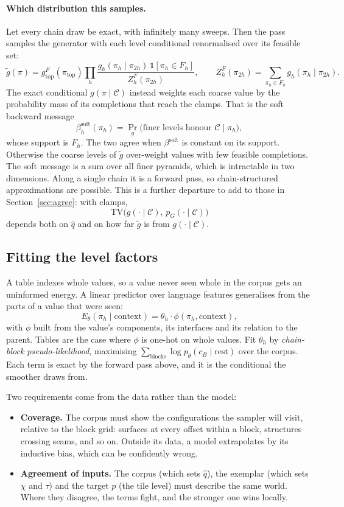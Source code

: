\documentclass[11pt]{article}
\newcommand{\1}{\mathds{1}}
\begin{document}
\paragraph{Which distribution this samples.} Let every chain draw be exact, with infinitely many
sweeps. Then the pass samples the generator with each level conditional renormalised over its
feasible set:
\[
  \tilde g(\pi) = g_{\text{top}}^{F}(\pi_{\text{top}})
  \prod_h \frac{g_h(\pi_h \mid \pi_{2h})\,\1[\pi_h \in F_h]}{Z^F_h(\pi_{2h})},
  \qquad
  Z^F_h(\pi_{2h}) = \sum_{\pi_h \in F_h} g_h(\pi_h \mid \pi_{2h}).
\]
The exact conditional $g(\pi \mid \mathcal C)$ instead weights each coarse value by the
probability mass of its completions that reach the clamps. That is the soft backward message
\[
  \beta^{\text{soft}}_h(\pi_h) = \Pr_g\big(\text{finer levels honour } \mathcal C \mid \pi_h\big),
\]
whose support is $F_h$. The two agree when $\beta^{\text{soft}}$ is constant on its support.
Otherwise the coarse levels of $\tilde g$ over-weight values with few feasible completions.
The soft message is a sum over all finer pyramids, which is intractable in two dimensions. Along a
single chain it is a forward pass, so chain-structured approximations are possible. This is a
further departure to add to those in Section~\ref{sec:agree}: with clamps,
\[
  \mathrm{TV}\big(g(\cdot \mid \mathcal C),\, p_G(\cdot \mid \mathcal C)\big)
\]
depends both on $\hat q$ and on how far $\tilde g$ is from $g(\cdot \mid \mathcal C)$.

\subsection{Fitting the level factors}

A table indexes whole values, so a value never seen whole in the corpus gets an uninformed
energy. A linear predictor over language features generalises from the parts of a value that
were seen:
\[
  E_\theta(\pi_h \mid \text{context}) = \theta_h \cdot \phi(\pi_h, \text{context}),
\]
with $\phi$ built from the value's components, its interfaces and its relation to the parent.
Tables are the case where $\phi$ is one-hot on whole values. Fit $\theta_h$ by \emph{chain-block
pseudo-likelihood}, maximising $\sum_{\text{blocks}} \log p_\theta(c_B \mid \text{rest})$ over the corpus.
Each term is exact by the forward pass above, and it is the conditional the smoother draws from.

Two requirements come from the data rather than the model:
\begin{itemize}
  \item \textbf{Coverage.} The corpus must show the configurations the sampler will visit,
        relative to the block grid: surfaces at every offset within a block, structures
        crossing seams, and so on. Outside its data, a model extrapolates by its inductive
        bias, which can be confidently wrong.
  \item \textbf{Agreement of inputs.} The corpus (which sets $\hat q$), the exemplar (which
        sets $\chi$ and $\tau$) and the target $p$ (the tile level) must describe the same
        world. Where they disagree, the terms fight, and the stronger one wins locally.
\end{itemize}
\end{document}
